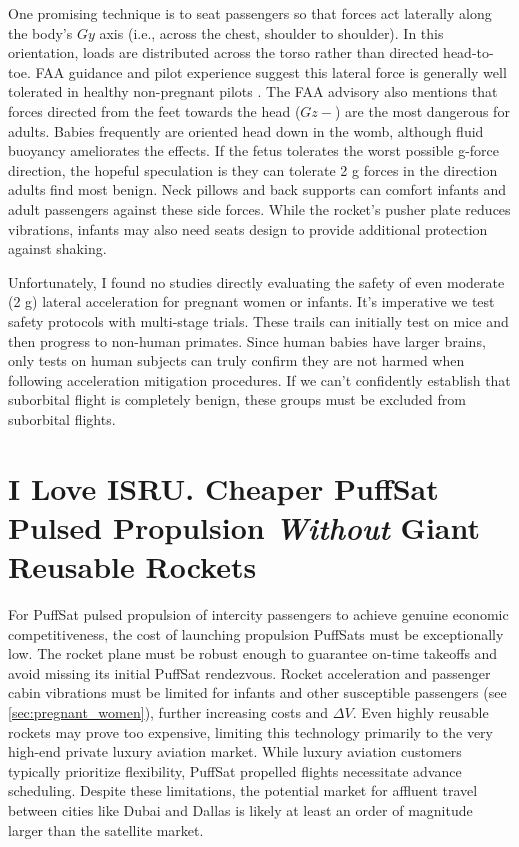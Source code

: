 \documentclass{article}
\begin{document}
{One promising technique is to seat passengers so that forces act laterally along the body’s $Gy$ axis (i.e., across the chest, shoulder to shoulder). In this orientation, loads are distributed across the torso rather than directed head-to-toe.  FAA guidance and pilot experience suggest this lateral force is generally well tolerated in healthy non-pregnant pilots \cite{lateral_acceleration}.  The FAA advisory also mentions that forces directed from the feet towards the head ($Gz-$) are the most dangerous for adults.   Babies frequently are oriented head down in the womb, although fluid buoyancy ameliorates the effects.    If the fetus tolerates the worst possible g-force direction, the hopeful speculation is they can tolerate 2 g forces in the direction adults find most benign.  Neck pillows and back supports can comfort infants and adult passengers against these side forces.  While the rocket's pusher plate reduces vibrations, infants may also need seats design to provide additional protection against shaking.

Unfortunately, I found no studies directly evaluating the safety of even moderate (2 g) lateral acceleration for pregnant women or infants. It's imperative we test safety protocols with  multi-stage trials.   These trails can initially test on mice and then progress to non-human primates.  Since human babies have larger brains, only tests on human subjects can truly confirm they are not harmed when following acceleration mitigation procedures.  If we can't confidently establish that suborbital flight is completely benign, these groups must be excluded from suborbital flights.  

\section{I Love ISRU.  Cheaper PuffSat Pulsed Propulsion \textit{Without} Giant Reusable Rockets}
For PuffSat pulsed propulsion of intercity passengers to achieve genuine economic competitiveness, the cost of launching  propulsion PuffSats must be exceptionally low.  The rocket plane must be robust enough to guarantee on-time takeoffs and avoid missing its initial PuffSat rendezvous.  Rocket acceleration and passenger cabin vibrations must be limited for infants and other susceptible passengers (see \autoref{sec:pregnant_women}), further increasing costs and $\Delta V$.  Even highly reusable rockets may prove too expensive, limiting this technology primarily to the very high-end private luxury aviation market. While luxury aviation customers typically prioritize flexibility, PuffSat propelled flights necessitate advance scheduling.  Despite these limitations, the potential market for affluent travel between cities like Dubai and Dallas is likely at least an order of magnitude larger than the satellite market.

}
\end{document}
